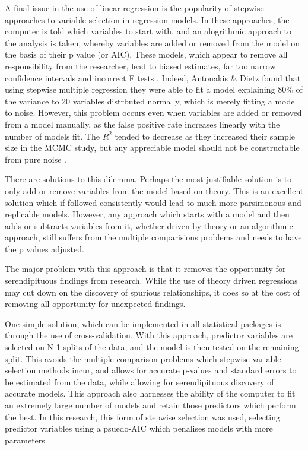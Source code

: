 A final issue in the use of linear regression is the popularity of stepwise approaches to variable selection in regression models\cite{antonakis2010looking}. In these approaches, the computer is told which variables to start with, and an alogrithmic approach to the analysis is taken, whereby variables are added or removed from the model on the basis of their p value (or AIC). These models, which appear to remove all responsibility from the researcher, lead to biased estimates, far too narrow confidence intervals and incorrect F tests \cite{antonakis2010looking} \cite{gelman2007data}. Indeed, Antonakis \& Dietz found that using stepwise multiple regression they were able to fit a model explaining 80\% of the variance to 20 variables distrbuted normally, which is merely fitting a model to noise. However, this problem occurs even when variables are added or removed from a model manually, as the false positive rate increases linearly with the number of models fit. The $R^2$ tended to decrease as they increased their sample size in the MCMC study, but any appreciable model should not be constructable from pure noise \cite{antonakis2010looking}.

There are solutions to this dilemma. Perhaps the most justifiable solution is to only add or remove variables from the model based on theory. This is an excellent solution which if followed consistently would lead to much more parsimonous and replicable models. However, any approach which starts with a model and then adds or subtracts variables from it, whether driven by theory or an algorithmic approach, still suffers from the multiple comparisions problems and needs to have the p values adjusted. 

The major problem with this approach is that it removes the opportunity for serendipituous findings from research. While the use of theory driven regressions may cut down on the discovery of spurious relationships, it does so at the cost of removing all opportunity for unexpected findings.

One simple solution, which can be implemented in all statistical packages is through the use of cross-validation. With this approach, predictor variables are selected on N-1 splits of the data, and the model is then tested on the remaining split. This avoids the multiple comparison problems which stepwise variable selection methods incur, and allows for accurate p-values and standard errors to be estimated from the data, while allowing for serendipituous discovery of accurate models. This approach also harnesses the ability of the computer to fit an extremely large number of models and retain those predictors which perform the best. In this research, this form of stepwise selection was used, selecting predictor variables using a psuedo-AIC which penalises models with more parameters \cite{venables2002modern}.  

